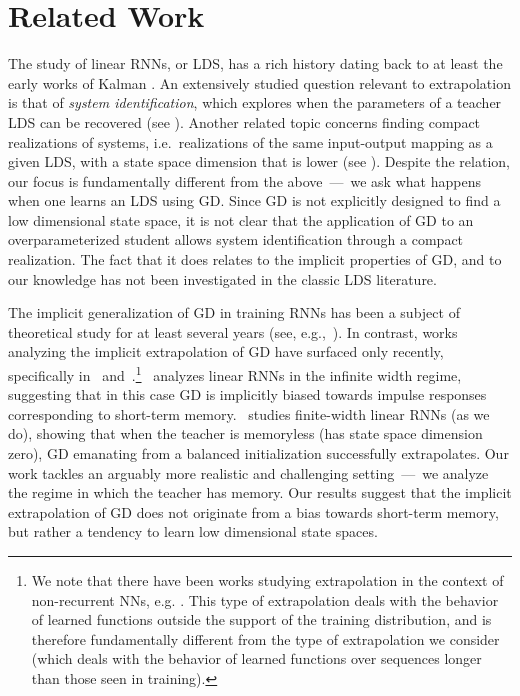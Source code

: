 \section{Related Work}\label{sec:related_work}
The study of linear RNNs, or LDS, has a rich history dating back to at least the early works of Kalman \citep{kalman1960general, kalman1963mathematical}. 
An extensively studied question relevant to extrapolation is that of \textit{system identification}, which explores when the parameters of a teacher LDS can be recovered (see \cite{ljung1999system}).
Another related topic concerns finding compact realizations of systems, i.e.~realizations of the same input-output mapping as a given LDS, with a state space dimension that is lower (see \cite{antoulas2005approximation}).
%
Despite the relation, our focus is fundamentally different from the above~---~we ask what happens when one learns an LDS using GD. 
Since GD is not explicitly designed to find a low dimensional state space, it is not clear that the application of GD to an overparameterized student allows system identification through a compact realization. 
The fact that it does relates to the implicit properties of GD, and to our knowledge has not been investigated in the classic LDS literature.

The implicit generalization of GD in training RNNs has been a subject of theoretical study for at least several years (see, e.g.,~\cite{hardt2016gradient, allen2019convergence, lim2021noisy}).
In contrast, works analyzing the implicit extrapolation of GD have surfaced only recently, specifically in~\cite{emami2021implicit} and~\cite{cohen2022extrapolation}.\footnote{%
We note that there have been works studying extrapolation in the context of non-recurrent NNs, e.g. \cite{xu2020neural}. This type of extrapolation deals with the behavior of learned functions outside the support of the training distribution, and is therefore fundamentally different from the type of extrapolation we consider (which deals with the behavior of learned functions over sequences longer than those seen in training).
}
\cite{emami2021implicit}~analyzes linear RNNs in the infinite width regime, suggesting that in this case GD is implicitly biased towards impulse responses corresponding to short-term memory. 
\cite{cohen2022extrapolation}~studies finite-width linear RNNs (as we do), showing that when the teacher is memoryless (has state space dimension zero), GD emanating from a balanced initialization successfully extrapolates.
Our work tackles an arguably more realistic and challenging setting~---~we analyze the regime in which the teacher has memory.
Our results suggest that the implicit extrapolation of GD does not originate from a bias towards short-term memory, but rather a tendency to learn low dimensional state spaces.

